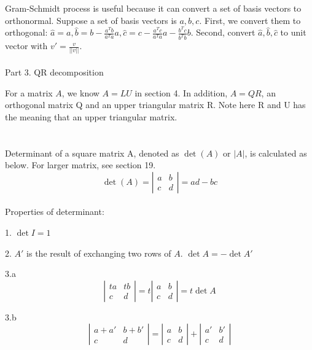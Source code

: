 \documentclass{article}
\begin{document}
\begin{spacing}{1.5}
Gram-Schmidt process is useful because it can convert a set of basis vectors to orthonormal. Suppose a set of basis vectors is $a, b, c$. First, we convert them to orthogonal: $\hat a = a, \hat b = b - \frac{a^Tb}{a^Ta}a, \hat c = c - \frac{a^Tc}{a^Ta}a - \frac{b^Tc}{b^Tb}b$. Second, convert $\hat a, \hat b, \hat c$ to unit vector with $v' = \frac{v}{||v||}$. 
\\\\ Part 3. QR decomposition

For a matrix $A$, we know $A=LU$ in section 4. In addition, $A= QR$, an orthogonal matrix Q and an upper triangular matrix R. Note here R and U has the meaning that an upper triangular matrix.


\section{}
\hspace*{0.5cm}Determinant of a square matrix A, denoted as $\det(A)$ or $|A|$, is calculated as below. For larger matrix, see section 19.
\[ 
\det(A) = \left|\begin{array}{cccc}   
a &   b \\   
c &   d
\end{array}\right| 
= ad - bc
\] \\
Properties of determinant:

1. $\det I=1$ 

2. $A'$ is the result of exchanging two rows of $A$. $\det A = -\det A'$

3.a \[ 
\left|\begin{array}{cccc}   
ta &   tb \\   
c &   d
\end{array}\right| 
= t
\left|\begin{array}{cccc}   
a &   b \\   
c &   d
\end{array}\right| 
= t\det A
\] 

3.b
\[ 
\left|\begin{array}{cccc}   
a+a' &   b+b' \\   
c &   d
\end{array}\right| 
=
\left|\begin{array}{cccc}   
a &   b \\   
c &   d
\end{array}\right| 
+
\left|\begin{array}{cccc}   
a' &   b' \\   
c &   d
\end{array}\right| 
\]


\end{spacing}
\end{document}
